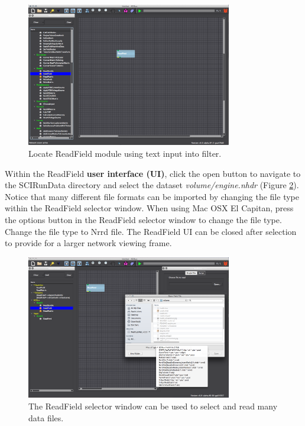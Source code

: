\documentclass[fleqn,11pt,openany]{book}
\begin{document}
\begin{figure}[H]
\center
\includegraphics[width=0.8\textwidth]{BasicTutorial_figures/readfield.png}
\caption{Locate ReadField module using text input into filter.}
\label{fig:readfield2}
\end{figure}

Within the ReadField \textbf{user interface (UI)}, click the open button to navigate to the SCIRunData directory and select the dataset \emph{volume/engine.nhdr} (Figure \ref{fig:readfieldtype}). Notice that many different file formats can be imported by changing the file type within the ReadField selector window. When using Mac OSX El Capitan, press the options button in the ReadField selector window to change the file type. Change the file type to Nrrd file. The ReadField UI can be closed after selection to provide for a larger network viewing frame. 

\begin{figure}[H]
\center
\includegraphics[width=0.8\textwidth]{BasicTutorial_figures/readfield_select.png}
\caption{The ReadField selector window can be used to select and read many data files.}
\label{fig:readfieldtype}
\end{figure}
\end{document}
